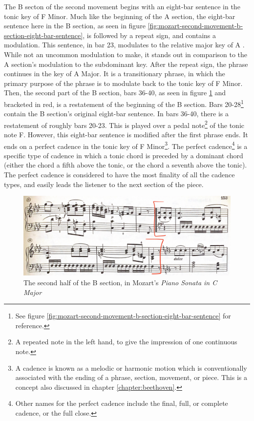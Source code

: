 The B secton of the second movement begins with an eight-bar sentence in the tonic key of F Minor. Much like the beginning of the A section, the eight-bar sentence here in the B section, as seen in figure \ref{fig:mozart-second-movement-b-section-eight-bar-sentence}\autocite{Henle_1977}, is followed by a repeat sign, and contains a modulation. This sentence, in bar 23, modulates to the relative major key of A \musFlat{}. While not an uncommon modulation to make, it stands out in comparison to the A section's modulation to the subdominant key. After the repeat sign, the phrase continues in the key of A\musFlat{} Major. It is a transitionary phrase, in which the primary purpose of the phrase is to modulate back to the tonic key of F Minor. Then, the second part of the B section, bars 36-40, as seen in figure \ref{fig:mozart-second-movement-second-half-b-section}\autocite{Henle_1977} and bracketed in red, is a restatement of the beginning of the B section. Bars 20-28\footnote{See figure \ref{fig:mozart-second-movement-b-section-eight-bar-sentence} for reference.} contain the B section's original eight-bar sentence. In bars 36-40, there is a restatement of roughly bars 20-23. This is played over a pedal note\footnote{A repeated note in the left hand, to give the impression of one continuous note.} of the tonic note F. However, this eight-bar sentence is modified after the first phrase ends. It ends on a perfect cadence\autocite{Nagley_Whittall_2011} in the tonic key of F Minor\footnote{A cadence is known as a melodic or harmonic motion which is conventionally associated with the ending of a phrase, section, movement, or piece. This is a concept also discussed in chapter \ref{chapter:beethoven}.}. The perfect cadence\footnote{Other names for the perfect cadence include the final, full, or complete cadence, or the full close.} is a specific type of cadence in which a tonic chord is preceded by a dominant chord (either the chord a fifth above the tonic, or the chord a seventh above the tonic). The perfect cadence is considered to have the most finality of all the cadence types, and easily leads the listener to the next section of the piece.

\begin{figure}
	\centering
	\includegraphics[width=\textwidth]{figures/mozart-second-movement-second-half-b-section.jpg}
	\caption{The second half of the B section, in Mozart's \textit{Piano Sonata in C Major}}
	\label{fig:mozart-second-movement-second-half-b-section}
\end{figure}

